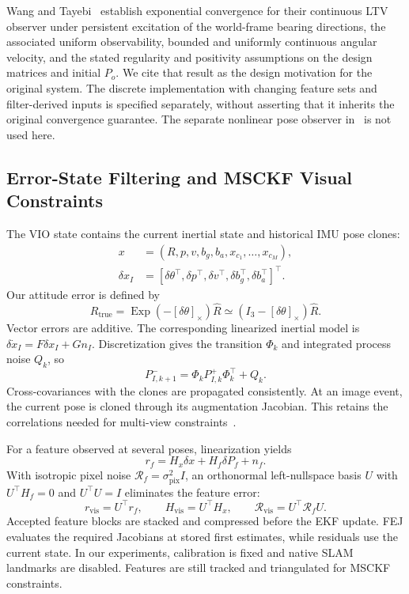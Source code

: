 \documentclass[a4paper,runningheads,twocolumn]{llncs}
\newcommand{\sk}[1]{[#1]_{\times}}
\newcommand{\Exp}{\operatorname{Exp}}
\begin{document}
Wang and Tayebi~\cite{wang2024} establish exponential convergence for their continuous LTV observer under persistent excitation of the world-frame bearing directions, the associated uniform observability, bounded and uniformly continuous angular velocity, and the stated regularity and positivity assumptions on the design matrices and initial $P_o$. We cite that result as the design motivation for the original system. The discrete implementation with changing feature sets and filter-derived inputs is specified separately, without asserting that it inherits the original convergence guarantee. The separate nonlinear pose observer in~\cite{wang2024} is not used here.

\subsection{Error-State Filtering and MSCKF Visual Constraints}
The VIO state contains the current inertial state and historical IMU pose clones:
\begin{equation}
 \begin{aligned}
 x&=(R,p,v,b_g,b_a,x_{c_1},\ldots,x_{c_M}),\\
 \delta x_I&=[\delta\theta^\top,\delta p^\top,\delta v^\top,
              \delta b_g^\top,\delta b_a^\top]^\top .
 \end{aligned}
\end{equation}
Our attitude error is defined by
\begin{equation}
 R_{\mathrm{true}}=\Exp(-\sk{\delta\theta})\hat R
       \simeq (I_3-\sk{\delta\theta})\hat R .
 \label{eq:attitudeerror}
\end{equation}
Vector errors are additive. The corresponding linearized inertial model is
$\delta\dot x_I=F\delta x_I+Gn_I$. Discretization gives the transition $\Phi_k$ and integrated process noise $Q_k$, so
\begin{equation}
 P_{I,k+1}^-=\Phi_kP_{I,k}^+\Phi_k^\top+Q_k .
 \label{eq:covprop}
\end{equation}
Cross-covariances with the clones are propagated consistently. At an image event, the current pose is cloned through its augmentation Jacobian. This retains the correlations needed for multi-view constraints~\cite{sun2018,geneva2020}.

For a feature observed at several poses, linearization yields
\begin{equation}
 r_f=H_x\delta x+H_f\delta P_f+n_f .
\end{equation}
With isotropic pixel noise $\mathcal R_f=\sigma_{\mathrm{pix}}^2I$, an orthonormal left-nullspace basis $U$ with $U^\top H_f=0$ and $U^\top U=I$ eliminates the feature error:
\begin{equation}
 r_{\mathrm{vis}}=U^\top r_f,\qquad
 H_{\mathrm{vis}}=U^\top H_x,\qquad
 \mathcal R_{\mathrm{vis}}=U^\top\mathcal R_fU .
 \label{eq:msckf}
\end{equation}
Accepted feature blocks are stacked and compressed before the EKF update. FEJ evaluates the required Jacobians at stored first estimates, while residuals use the current state. In our experiments, calibration is fixed and native SLAM landmarks are disabled. Features are still tracked and triangulated for MSCKF constraints.
\end{document}
